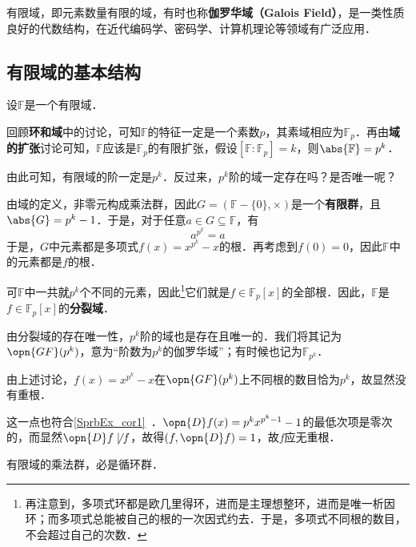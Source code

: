

有限域，即元素数量有限的域，有时也称\textbf{伽罗华域（Galois Field）}，是一类性质良好的代数结构，在近代编码学、密码学、计算机理论等领域有广泛应用．

\subsection{有限域的基本结构}



设$\mathbb{F}$是一个有限域．

回顾\textbf{环和域}中的讨论，可知$\mathbb{F}$的特征一定是一个素数$p$，其素域相应为$\mathbb{F}_p$．再由\textbf{域的扩张}讨论可知，$\mathbb{F}$应该是$\mathbb{F}_p$的有限扩张，假设$[\mathbb{F}:\mathbb{F}_p]=k$，则$\abs{\mathbb{F}}=p^k$．

由此可知，有限域的阶一定是$p^k$．反过来，$p^k$阶的域一定存在吗？是否唯一呢？

由域的定义，非零元构成乘法群，因此$G=(\mathbb{F}-\{0\}, \times)$是一个\textbf{有限群}，且$\abs{G}=p^k-1$．于是，对于任意$a\in G\subseteq\mathbb{F}$，有
\begin{equation}
a^{p^k}=a
\end{equation}
于是，$G$中元素都是多项式$f(x)=x^{p^k}-x$的根．再考虑到$f(0)=0$，因此$\mathbb{F}$中的元素都是$f$的根．

可$\mathbb{F}$中一共就$p^k$个不同的元素，因此\footnote{再注意到，多项式环都是欧几里得环，进而是主理想整环，进而是唯一析因环；而多项式总能被自己的根的一次因式约去．于是，多项式不同根的数目，不会超过自己的次数．}它们就是$f\in\mathbb{F}_p[x]$的全部根．因此，$\mathbb{F}$是$f\in\mathbb{F}_p[x]$的\textbf{分裂域}．

由分裂域的存在唯一性，$p^k$阶的域也是存在且唯一的．我们将其记为$\opn{GF}(p^k)$，意为“阶数为$p^k$的伽罗华域”；有时候也记为$\mathbb{F}_{p^k}$．

\begin{example}{}
由上述讨论，$f(x)=x^{p^k}-x$在$\opn{GF}(p^k)$上不同根的数目恰为$p^k$，故显然没有重根．

这一点也符合\autoref{SprbEx_cor1}~．$\opn{D}f(x)=p^kx^{p^k-1}-1$的最低次项是零次的，而显然$\opn{D}f\not\mid f$，故得$(f, \opn{D}f)=1$，故$f$应无重根．
\end{example}


\begin{theorem}{}\label{FntFld_the1}
有限域的乘法群，必是循环群．
\end{theorem}


